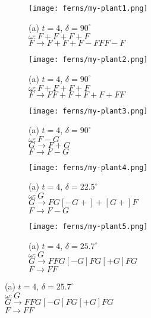 \begin{figure}[tbh]
\begin{center}
	\begin{subfigure}[tbh]{0.23\textwidth}
	\begin{center}
	\texttt{[image: ferns/my-plant1.png]}
	\caption{(a) $t = 4$, $\delta = 90^{\circ}$ \\ $\omega: F+F+F+F$ \\ $F \rightarrow F+F+F-FFF-F$}
	\end{center}
	\end{subfigure}
\hfill
	\begin{subfigure}[tbh]{0.23\textwidth}
	\begin{center}
	\texttt{[image: ferns/my-plant2.png]}
	\caption{(a) $t = 4$, $\delta = 90^{\circ}$ \\ $\omega: F+F+F+F$ \\ $F \rightarrow FF+F+F+F+FF$}
	\end{center}
	\end{subfigure}
\hfill
	\begin{subfigure}[tbh]{0.23\textwidth}
	\begin{center}
	\texttt{[image: ferns/my-plant3.png]}
	\caption{(a) $t = 4$, $\delta = 90^{\circ}$ \\ $\omega: F-G$ \\ $G \rightarrow F+G $\\ $F \rightarrow F-G$}
	\end{center}
	\end{subfigure}
\hfill
	\begin{subfigure}[tbh]{0.23\textwidth}
	\begin{center}
	\texttt{[image: ferns/my-plant4.png]}
	\caption{(a) $t = 4$, $\delta = 22.5^{\circ}$ \\ $\omega: G$ \\ $G \rightarrow FG[-G+]+[G+]F$\\ $F \rightarrow F-G$}
	\end{center}
	\end{subfigure}
\hfill
	\begin{subfigure}[tbh]{0.23\textwidth}
	\begin{center}
	\texttt{[image: ferns/my-plant5.png]}
	\caption{(a) $t = 4$, $\delta = 25.7^{\circ}$ \\ $\omega: G $\\ $G \rightarrow FFG[-G]FG[+G]FG$\\ $F \rightarrow FF$}

\end{center}
\end{subfigure}
\end{center}
\end{figure}
